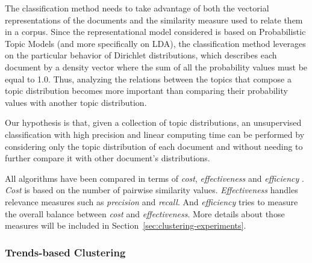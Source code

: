 The classification method needs to take advantage of both the vectorial representations of the documents and the similarity measure used to relate them in a corpus. Since the representational model considered is based on Probabilistic Topic Models (and more specifically on LDA), the classification method leverages on the particular behavior of Dirichlet distributions, which describes each document by a density vector where the sum of all the probability values must be equal to 1.0. Thus, analyzing the relations between the topics that compose a topic distribution becomes more important than comparing their probability values with another topic distribution.

Our hypothesis is that, given a collection of topic distributions, an unsupervised classification with high precision and linear computing time can be performed by considering only the topic distribution of each document and without needing to further compare it with other document's distributions.

All algorithms have been compared in terms of \textit{cost}, \textit{effectiveness} and \textit{efficiency} \citep{Halkidi2001a}. \textit{Cost} is based on the number of pairwise similarity values. \textit{Effectiveness} handles relevance measures such as \textit{precision} and \textit{recall}. And \textit{efficiency} tries to measure the overall balance between \textit{cost} and \textit{effectiveness}. More details about those measures will be included in Section~\ref{sec:clustering-experiments}.

\subsubsection{Trends-based Clustering}

